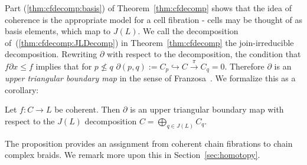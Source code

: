  Part (\ref{thm:cfdecomp:basis}) of Theorem~\ref{thm:cfdecomp} shows that the idea of coherence is the appropriate model for a cell fibration - cells may be thought of as basis elements, which map to $J(L)$.  We call the decomposition of~(\ref{thm:cfdecomp:JLDecomp}) in Theorem~\ref{thm:cfdecomp}  the join-irreducible decomposition.   Rewriting $\partial$ with respect to the decomposition, the condition that $f\partial x \leq f$ implies that for $p\not\leq q$ $\partial(p,q):=C_p\hookrightarrow C \xrightarrow{\pi} C_q =0$.   Therefore $\partial$ is an {\em upper triangular boundary map} in the sense of Franzosa~\cite[Definition 3.1]{fran}.   We formalize this as a corollary:


 
 
 
 \begin{cor}\label{cor:ccf:ut}
 Let $f:C\to L$ be coherent.  Then $\partial$ is an upper triangular boundary map with respect to the $J(L)$ decomposition $C=\bigoplus_{q\in J(L)}C_q$.
 \end{cor}

%
%
%
%
%

 The proposition provides an assignment from coherent chain fibrations to chain complex braids.  We remark more upon this in Section~\ref{sec:homotopy}.


